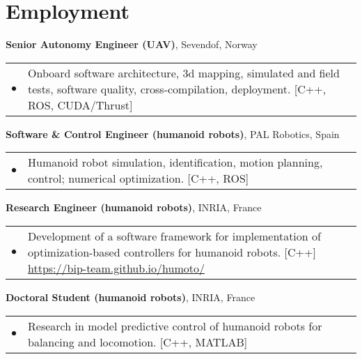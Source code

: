 \documentclass[a4paper,10pt]{report}
\begin{document}
\vspace{0.2cm}
\section{Employment}
\begin{adjustwidth}{0.5cm}{0pt}
    {\bf {} Senior Autonomy Engineer (UAV)}, Sevendof, Norway\\
        \begin{tabularx}{\linewidth}{l X}
            \hfill $\bullet$    & Onboard software architecture, 3d mapping, simulated and field tests,
                                  software quality, cross-compilation, deployment. [C++, ROS, CUDA/Thrust]
        \end{tabularx}

    \vspace{0.2cm}

    {\bf {} Software \& Control Engineer (humanoid robots)}, PAL Robotics, Spain\\
        \begin{tabularx}{\linewidth}{l X}
            \hfill $\bullet$    & Humanoid robot simulation, identification, motion planning, control;
                                  numerical optimization. [C++, ROS]
        \end{tabularx}

    \vspace{0.2cm}

    {\bf {} Research Engineer (humanoid robots)}, INRIA, France\\
        \begin{tabularx}{\linewidth}{l X}
            \hfill $\bullet$    & Development of a software framework for implementation
                                  of optimization-based controllers for humanoid robots.
                                  [C++]
                                  \href{https://bip-team.github.io/humoto/}{https://bip-team.github.io/humoto/}
        \end{tabularx}

    \vspace{0.2cm}

    {\bf {} Doctoral Student (humanoid robots)}, INRIA, France\\
        \begin{tabularx}{\linewidth}{l X}
            \hfill $\bullet$    & Research in model predictive control of humanoid robots for
                                  balancing and locomotion.
                                  [C++, MATLAB]
        \end{tabularx}


\end{adjustwidth}
\end{document}
